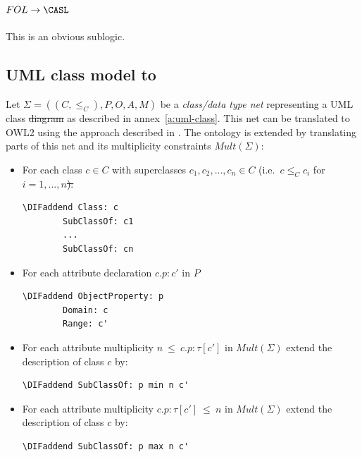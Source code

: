 \documentclass[10pt,fleqn,final]{scrreprt}
\newcommand{\ssclause}[1]{\subsection{#1}}
\newenvironment{definitions}[0]{\medskip }{}
\providecommand{\DIFadd}[1]{{\protect\color{blue}\uwave{#1}}} %
\providecommand{\DIFdel}[1]{{\protect\color{red}\sout{#1}}}                      %
\providecommand{\DIFaddbegin}{} %
\providecommand{\DIFaddend}{} %
\providecommand{\DIFdelbegin}{} %
\providecommand{\DIFdelend}{} %
\begin{document}
\begin{definitions}
\ssclause{$FOL \to \CASL$}
This is an obvious sublogic.

 

\DIFdelbegin %
\DIFdelend \DIFaddbegin \ssclause{UML class model to \OWL}
\DIFaddend Let $\Sigma = ((C, {\leq_C}), P, O, A, M)$ be a \emph{class/data type net} representing a UML 
class \DIFdelbegin \DIFdel{diagram }\DIFdelend \DIFaddbegin \DIFadd{model }\DIFaddend as described in annex~\ref{a:uml-class}. This net can be translated to OWL2 using the approach described in \cite{zedlitz2012uml}.
The ontology is extended by translating parts of this net and its multiplicity constraints $\mathit{Mult}(\Sigma)$:
\begin{itemize}
\item For each class $c \in C$ with superclasses \DIFdelbegin \DIFdel{$c_1,c_2,...,c_n \in C$ }\DIFdelend \DIFaddbegin \DIFadd{$c_1,c_2,\ldots,c_n \in C$ }\DIFaddend (i.e.\ $c \leq_C c_i$ for \DIFdelbegin \DIFdel{$i=1,...,n$):
}%
\DIFdelend \DIFaddbegin \DIFadd{$i=1,\ldots,n$):
}\begin{lstlisting}[language=owl2Manchester]
	\DIFaddend Class: c
		SubClassOf: c1
		...
		SubClassOf: cn
\end{lstlisting}
\item For each attribute declaration $c.p:c'$ in $P$
\DIFdelbegin %
\DIFdelend \DIFaddbegin \begin{lstlisting}[language=owl2Manchester]
	\DIFaddend ObjectProperty: p
		Domain: c
		Range: c'
\end{lstlisting}

\item For each attribute multiplicity $n\ \mathsf{\leq}\ c.p:\tau[c']$ in $\mathit{Mult}(\Sigma)$ extend the description of class $c$ by:
\DIFdelbegin %
\DIFdelend \DIFaddbegin \begin{lstlisting}[language=owl2Manchester]
	\DIFaddend SubClassOf: p min n c'
\end{lstlisting}

\item For each attribute multiplicity $ c.p:\tau[c'] \ \mathsf{\leq}\ n$  in $\mathit{Mult}(\Sigma)$ extend the description of class $c$ by:
\DIFdelbegin %
\DIFdelend \DIFaddbegin \begin{lstlisting}[language=owl2Manchester]
	\DIFaddend SubClassOf: p max n c'
\end{lstlisting}


\end{itemize}
\end{definitions}
\end{document}
